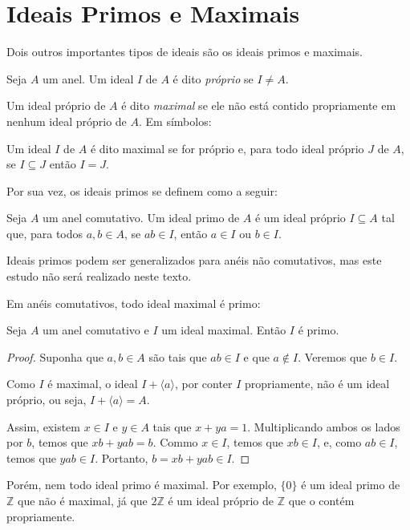 \section{Ideais Primos e Maximais}
Dois outros importantes tipos de ideais são os ideais primos e maximais.

\begin{definition}
Seja $A$ um anel.
Um ideal $I$ de $A$ é dito \emph{próprio} se $I\neq A$.

Um ideal próprio de $A$ é dito \emph{maximal} se ele não está contido propriamente em nenhum ideal próprio de $A$.
Em símbolos:

Um ideal $I$ de $A$ é dito maximal se for próprio e, para todo ideal próprio $J$ de $A$, se $I\subseteq J$ então $I=J$.
\end{definition}

Por sua vez, os ideais primos se definem como a seguir:

\begin{definition}
    Seja $A$ um anel comutativo.
    Um ideal primo de $A$ é um ideal próprio $I\subseteq A$ tal que, para todos $a, b \in A$, se $ab \in I$, então $a \in I$ ou $b \in I$.
\end{definition}

Ideais primos podem ser generalizados para anéis não comutativos, mas este estudo não será realizado neste texto.

Em anéis comutativos, todo ideal maximal é primo:

\begin{prop}
Seja $A$ um anel comutativo e $I$ um ideal maximal.
Então $I$ é primo.
\end{prop}

\begin{proof}
    Suponha que $a, b \in A$ são tais que $ab \in I$ e que $a \notin I$.
    Veremos que $b \in I$.

    Como $I$ é maximal, o ideal $I+\langle a\rangle$, por conter $I$ propriamente, não é um ideal próprio, ou seja, $I+\langle a\rangle=A$.

    Assim, existem $x \in I$ e $y \in A$ tais que $x+ya=1$.
    Multiplicando ambos os lados por $b$, temos que $xb+yab=b$.
    Commo $x \in I$, temos que $xb \in I$, e, como $ab \in I$, temos que $yab \in I$.
    Portanto, $b=xb+yab\in I$.
\end{proof}

Porém, nem todo ideal primo é maximal. Por exemplo, $\{0\}$ é um ideal primo de $\mathbb Z$ que não é maximal, já que $2\mathbb Z$ é um ideal próprio de $\mathbb Z$ que o contém propriamente.


